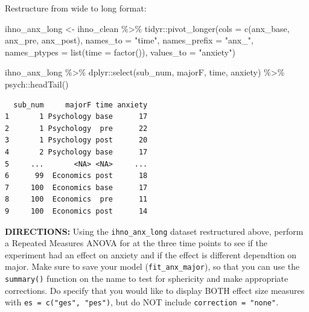 \documentclass[
]{article}
\newenvironment{Shaded}{\begin{snugshade}}{\end{snugshade}}
\newcommand{\AttributeTok}[1]{\textcolor[rgb]{0.77,0.63,0.00}{#1}}
\newcommand{\FunctionTok}[1]{\textcolor[rgb]{0.00,0.00,0.00}{#1}}
\newcommand{\NormalTok}[1]{#1}
\newcommand{\OtherTok}[1]{\textcolor[rgb]{0.56,0.35,0.01}{#1}}
\newcommand{\SpecialCharTok}[1]{\textcolor[rgb]{0.00,0.00,0.00}{#1}}
\newcommand{\StringTok}[1]{\textcolor[rgb]{0.31,0.60,0.02}{#1}}
\begin{document}
Restructure from wide to long format:

\begin{Shaded}
\begin{Highlighting}[]
\NormalTok{ihno\_anx\_long }\OtherTok{\textless{}{-}}\NormalTok{ ihno\_clean }\SpecialCharTok{\%\textgreater{}\%} 
\NormalTok{  tidyr}\SpecialCharTok{::}\FunctionTok{pivot\_longer}\NormalTok{(}\AttributeTok{cols =} \FunctionTok{c}\NormalTok{(anx\_base, anx\_pre, anx\_post),}
                      \AttributeTok{names\_to =} \StringTok{"time"}\NormalTok{,}
                      \AttributeTok{names\_prefix =} \StringTok{"anx\_"}\NormalTok{,}
                      \AttributeTok{names\_ptypes =} \FunctionTok{list}\NormalTok{(}\AttributeTok{time =} \FunctionTok{factor}\NormalTok{()),}
                      \AttributeTok{values\_to =} \StringTok{"anxiety"}\NormalTok{)}
\end{Highlighting}
\end{Shaded}

\begin{Shaded}
\begin{Highlighting}[]
\NormalTok{ihno\_anx\_long }\SpecialCharTok{\%\textgreater{}\%} 
\NormalTok{  dplyr}\SpecialCharTok{::}\FunctionTok{select}\NormalTok{(sub\_num, majorF, time, anxiety) }\SpecialCharTok{\%\textgreater{}\%} 
\NormalTok{  psych}\SpecialCharTok{::}\FunctionTok{headTail}\NormalTok{()}
\end{Highlighting}
\end{Shaded}

\begin{verbatim}
  sub_num     majorF time anxiety
1       1 Psychology base      17
2       1 Psychology  pre      22
3       1 Psychology post      20
4       2 Psychology base      17
5     ...       <NA> <NA>     ...
6      99  Economics post      18
7     100  Economics base      17
8     100  Economics  pre      11
9     100  Economics post      14
\end{verbatim}

\textbf{DIRECTIONS:} Using the \texttt{ihno\_anx\_long} dataset
restructured above, perform a Repeated Measures ANOVA for at the three
time points to see if the experiment had an effect on anxiety and if the
effect is different dependtion on major. Make sure to save your model
(\texttt{fit\_anx\_major}), so that you can use the \texttt{summary()}
function on the name to test for sphericity and make appropriate
corrections. Do specify that you would like to display BOTH effect size
measures with \texttt{es\ =\ c("ges",\ "pes")}, but do NOT include
\texttt{correction\ =\ "none"}.
\end{document}
